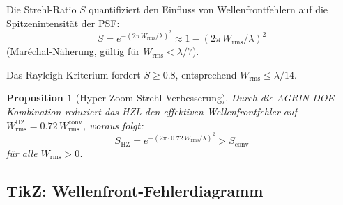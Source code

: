 ﻿\documentclass[12pt,a4paper]{article}
\newtheorem{proposition}[theorem]{Proposition}
\theoremstyle{definition}
\newcommand{\HZ}{\mathrm{HZ}}
\newcommand{\conv}{\mathrm{conv}}
\begin{document}
	Die Strehl-Ratio $S$ quantifiziert den Einfluss von Wellenfrontfehlern
	auf die Spitzenintensität der PSF:
	\begin{equation}
		S = e^{-(2\pi\,W_\mathrm{rms}/\lambda)^2}
		\approx 1 - (2\pi\,W_\mathrm{rms}/\lambda)^2
		\label{eq:strehl}
	\end{equation}
	(Maréchal-Näherung, gültig für $W_\mathrm{rms} < \lambda/7$).
	
	Das Rayleigh-Kriterium fordert $S \geq 0.8$, entsprechend
	$W_\mathrm{rms} \leq \lambda/14$.
	
	\begin{proposition}[Hyper-Zoom Strehl-Verbesserung]
		Durch die AGRIN-DOE-Kombina\-tion reduziert das HZL den effektiven
		Wellenfrontfehler auf $W_\mathrm{rms}^\HZ = 0.72\,W_\mathrm{rms}^\conv$,
		woraus folgt:
		\begin{equation}
			S_\HZ = e^{-(2\pi\cdot 0.72\,W_\mathrm{rms}/\lambda)^2}
			> S_\conv
		\end{equation}
		für alle $W_\mathrm{rms} > 0$.
	\end{proposition}
	
	\subsection{TikZ: Wellenfront-Fehlerdiagramm}
	
\end{document}
